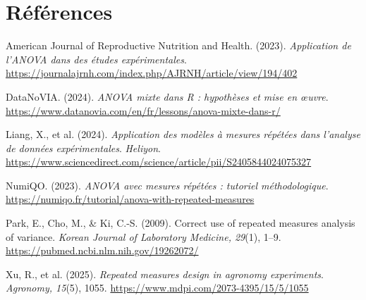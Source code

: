 \documentclass[12pt, a4paper]{report}
\begin{document}
\clearpage

\setcounter{page}{5}

\chapter*{Références}

American Journal of Reproductive Nutrition and Health. (2023). 
\textit{Application de l’ANOVA dans des études expérimentales}. 
\url{https://journalajrnh.com/index.php/AJRNH/article/view/194/402}

\vspace{0.3cm}

DataNoVIA. (2024). 
\textit{ANOVA mixte dans R : hypothèses et mise en œuvre}. 
\url{https://www.datanovia.com/en/fr/lessons/anova-mixte-dans-r/}

\vspace{0.3cm}

Liang, X., et al. (2024). 
\textit{Application des modèles à mesures répétées dans l’analyse de données expérimentales}. 
\textit{Heliyon}. 
\url{https://www.sciencedirect.com/science/article/pii/S2405844024075327}

\vspace{0.3cm}

NumiQO. (2023). 
\textit{ANOVA avec mesures répétées : tutoriel méthodologique}. 
\url{https://numiqo.fr/tutorial/anova-with-repeated-measures}

\vspace{0.3cm}

Park, E., Cho, M., \& Ki, C.-S. (2009). 
Correct use of repeated measures analysis of variance. 
\textit{Korean Journal of Laboratory Medicine, 29}(1), 1--9. 
\url{https://pubmed.ncbi.nlm.nih.gov/19262072/}

\vspace{0.3cm}

Xu, R., et al. (2025). 
\textit{Repeated measures design in agronomy experiments}. 
\textit{Agronomy, 15}(5), 1055. 
\url{https://www.mdpi.com/2073-4395/15/5/1055}
\end{document}
